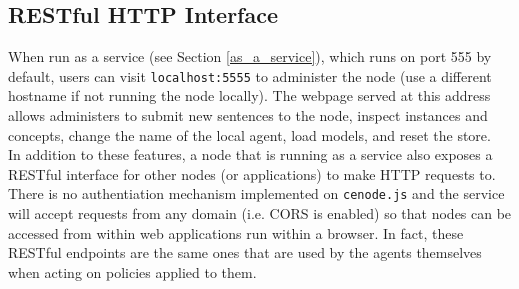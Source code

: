 \documentclass{scrartcl}
\begin{document}



\subsection{RESTful HTTP Interface}
\label{api_rest}
When run as a service (see Section \ref{as_a_service}), which runs on port 555 by default, users can visit \texttt{localhost:5555} to administer the node (use a different hostname if not running the node locally). The webpage served at this address allows administers to submit new sentences to the node, inspect instances and concepts, change the name of the local agent, load models, and reset the store.\\

In addition to these features, a node that is running as a service also exposes a RESTful interface for other nodes (or applications) to make HTTP requests to. There is no authentiation mechanism implemented on \texttt{cenode.js} and the service will accept requests from any domain (i.e. CORS is enabled) so that nodes can be accessed from within web applications run within a browser. In fact, these RESTful endpoints are the same ones that are used by the agents themselves when acting on policies applied to them.
\end{document}
